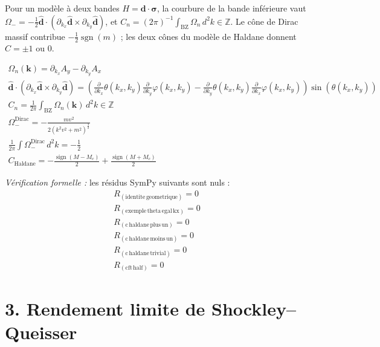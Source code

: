 \documentclass[11pt,a4paper,french]{article}
\begin{document}
Pour un modèle à deux bandes $H=\mathbf{d}\cdot\boldsymbol{\sigma}$, la courbure de la bande inférieure vaut $\Omega_-=-\tfrac12\hat{\mathbf{d}}\cdot(\partial_{k_x}\hat{\mathbf{d}}\times\partial_{k_y}\hat{\mathbf{d}})$, et $C_n=(2\pi)^{-1}\int_{\mathrm{BZ}}\Omega_n\,d^2k\in\mathbb{Z}$. Le cône de Dirac massif contribue $-\tfrac12\operatorname{sgn}(m)$ ; les deux cônes du modèle de Haldane donnent $C=\pm1$ ou $0$.

\begin{align}
\Omega_n(\mathbf{k}) = \partial_{k_x}A_y-\partial_{k_y}A_x \\
\hat{\mathbf{d}}\cdot(\partial_{k_x}\hat{\mathbf{d}}\times\partial_{k_y}\hat{\mathbf{d}}) = \left(\frac{\partial}{\partial k_{x}} \theta{\left(k_{x},k_{y} \right)} \frac{\partial}{\partial k_{y}} \varphi{\left(k_{x},k_{y} \right)} - \frac{\partial}{\partial k_{y}} \theta{\left(k_{x},k_{y} \right)} \frac{\partial}{\partial k_{x}} \varphi{\left(k_{x},k_{y} \right)}\right) \sin{\left(\theta{\left(k_{x},k_{y} \right)} \right)} \\
C_n = \frac{1}{2\pi}\int_{\mathrm{BZ}}\Omega_n(\mathbf{k})\,d^2k\in\mathbb{Z} \\
\Omega_-^{\mathrm{Dirac}} = - \frac{m v^{2}}{2 \left(k^{2} v^{2} + m^{2}\right)^{\frac{3}{2}}} \\
\frac{1}{2\pi}\int\Omega_-^{\mathrm{Dirac}}\,d^2k = - \frac{1}{2} \\
C_{\mathrm{Haldane}} = - \frac{\operatorname{sign}{\left(M - M_{c} \right)}}{2} + \frac{\operatorname{sign}{\left(M + M_{c} \right)}}{2}
\end{align}

\noindent\emph{Vérification formelle :} les résidus SymPy suivants sont nuls :
\begin{align}
R_{(\mathrm{identite\, geometrique})} = 0 \\
R_{(\mathrm{exemple\, theta\, egal\, kx})} = 0 \\
R_{(\mathrm{c\, haldane\, plus\, un})} = 0 \\
R_{(\mathrm{c\, haldane\, moins\, un})} = 0 \\
R_{(\mathrm{c\, haldane\, trivial})} = 0 \\
R_{(\mathrm{cft\, half})} = 0
\end{align}

\section{3. Rendement limite de Shockley--Queisser}
\end{document}
